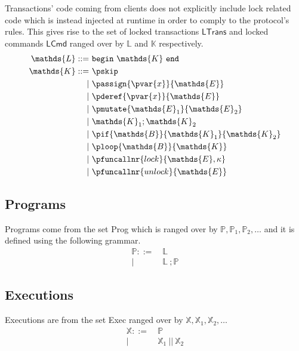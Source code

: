 Transactions' code coming from clients does not explicitly include lock related code which is instead injected at runtime in order to comply to the protocol's rules. This gives rise to the set of locked transactions $\textsf{LTrans}$ and locked commands $\textsf{LCmd}$ ranged over by $\mathds{L}$ and $\mathds{K}$ respectively.
\begin{align*}
\mathds{L} ::=&
\ \mathtt{begin}\ \mathds{K}\ \mathtt{end} \\
\mathds{K} ::=&
\ \pskip \\
|&\ \passign{\pvar{x}}{\mathds{E}} \\
|&\ \pderef{\pvar{x}}{\mathds{E}} \\
|&\ \pmutate{\mathds{E}_1}{\mathds{E}_2} \\
|&\ \mathds{K}_1; \mathds{K}_2 \\
|&\ \pif{\mathds{B}}{\mathds{K}_1}{\mathds{K}_2} \\
|&\ \ploop{\mathds{B}}{\mathds{K}} \\
|&\ \pfuncallnr{lock}{\mathds{E}, \kappa} \\
|&\ \pfuncallnr{unlock}{\mathds{E}}
\end{align*}

\subsection{Programs}

Programs come from the set \textsf{Prog} which is ranged over by $\mathds{P}, \mathds{P}_1, \mathds{P}_2, \ldots$ and it is defined using the following grammar.
\begin{align*}
\mathds{P} ::=&
\ \mathds{L} \\
|&\ \mathds{L}\ ; \mathds{P}
\end{align*}

\subsection{Executions}

Executions are from the set \textsf{Exec} ranged over by $\mathds{X}, \mathds{X}_1, \mathds{X}_2, \ldots$
\begin{align*}
\mathds{X} ::=&
\ \mathds{P} \\
|&\ \mathds{X}_1\ ||\ \mathds{X}_2 \\
\end{align*}